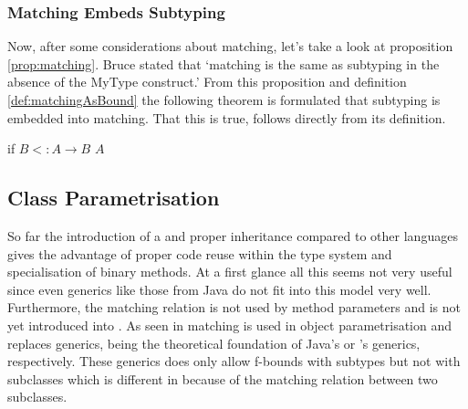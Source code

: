 \subsubsection{Matching Embeds Subtyping}
Now, after some considerations about matching, let's take a look at
proposition \ref{prop:matching}. Bruce stated that `matching is the
same as subtyping in the absence of the MyType construct.' From this
proposition and definition \ref{def:matchingAsBound} the following theorem
is formulated that subtyping is embedded into matching. That this is true,
follows directly from its definition.

\begin{prop}
	\label{prop:matchinIsSubtyping}
	if $B <: A \rightarrow B$ \match $A$
\end{prop}
%
%

%


\subsection{Class Parametrisation}
So far the introduction of a \mytype and proper inheritance compared to
other languages gives the advantage of proper code reuse within the type
system and specialisation of binary methods. At a first glance all this
seems not very useful since even generics like those from Java do not fit
into this model very well. Furthermore, the matching relation is not used
by method parameters and is not yet introduced into \ooplss.  As seen
in  matching is used in object
parametrisation and replaces generics, being the theoretical foundation
of Java's or \cs's generics, respectively. These generics does only
allow f-bounds with subtypes but not with subclasses which is different
in \ooplss because of the matching relation between two subclasses.

